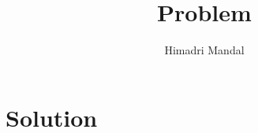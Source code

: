 \documentclass[11pt]{scrartcl}
\title{Problem}
\author{Himadri Mandal}
\begin{document}
\maketitle

\section{Solution}
\begin{soln}
\end{soln}
\end{document}
